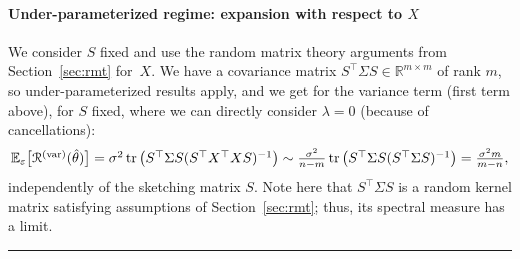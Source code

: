 \documentclass[11pt]{article}
\newcommand{\tr}{\mathop{ \rm tr}}
\newcommand{\rb}{\mathbb{R}}
\newcommand{\BlackBox}{\rule{1.5ex}{1.5ex}}  %
\newenvironment{proof}{\par\noindent{\bf Proof\ }}{\hfill\BlackBox\\[2mm]}
\newcommand{\mysec}[1]{Section~\ref{sec:#1}}
\def \S{  { \Sigma} }
\def \E{{\mathbb E}}
\begin{document}
\begin{proof}
\paragraph{Under-parameterized regime: expansion with respect to $X$}
We consider $S$ fixed and use the random matrix theory arguments from \mysec{rmt} for~$X$.
We have  a covariance matrix $S^\top \Sigma S \in \rb^{m \times m}$ of rank $m$, so under-parameterized results apply, and we get
for the variance term (first term above), for $S$ fixed, where we can directly consider $\lambda=0$ (because of cancellations):
 $$\textstyle
\E_\varepsilon \big[\mathcal{R}^{(\rm var)}(\hat{\theta}) \big] =  \sigma^2\tr \big(   S^\top \S  S ( S^\top X^\top X S )^{-1}  \big)
\sim  \frac{\sigma^2}{n-m} \tr \big(   S^\top \S  S ( S^\top \Sigma S)^{-1}  \big) = \frac{\sigma^2m}{m-n},
 $$
 independently of the sketching matrix $S$. Note here that $S^\top \Sigma S$ is a random kernel matrix satisfying assumptions of \mysec{rmt}; thus, its spectral measure has a limit.
 

\end{proof}
\end{document}
